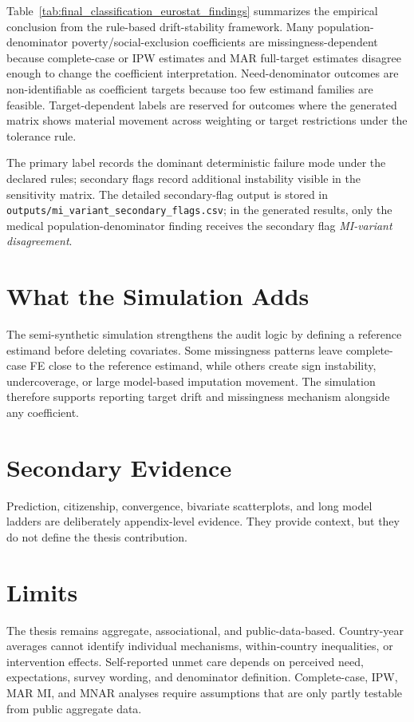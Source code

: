 Table~\ref{tab:final_classification_eurostat_findings} summarizes the empirical conclusion from the rule-based drift-stability framework. Many population-denominator poverty/social-exclusion coefficients are missingness-dependent because complete-case or IPW estimates and MAR full-target estimates disagree enough to change the coefficient interpretation. Need-denominator outcomes are non-identifiable as coefficient targets because too few estimand families are feasible. Target-dependent labels are reserved for outcomes where the generated matrix shows material movement across weighting or target restrictions under the tolerance rule.

The primary label records the dominant deterministic failure mode under the declared rules; secondary flags record additional instability visible in the sensitivity matrix. The detailed secondary-flag output is stored in \texttt{outputs/mi\_variant\_secondary\_flags.csv}; in the generated results, only the medical population-denominator finding receives the secondary flag \emph{MI-variant disagreement}.

\section{What the Simulation Adds}

The semi-synthetic simulation strengthens the audit logic by defining a reference estimand before deleting covariates. Some missingness patterns leave complete-case FE close to the reference estimand, while others create sign instability, undercoverage, or large model-based imputation movement. The simulation therefore supports reporting target drift and missingness mechanism alongside any coefficient.

\section{Secondary Evidence}

Prediction, citizenship, convergence, bivariate scatterplots, and long model ladders are deliberately appendix-level evidence. They provide context, but they do not define the thesis contribution.

\section{Limits}

The thesis remains aggregate, associational, and public-data-based. Country-year averages cannot identify individual mechanisms, within-country inequalities, or intervention effects. Self-reported unmet care depends on perceived need, expectations, survey wording, and denominator definition. Complete-case, IPW, MAR MI, and MNAR analyses require assumptions that are only partly testable from public aggregate data.

